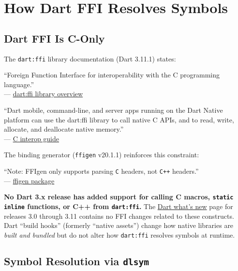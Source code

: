 \documentclass[11pt,a4paper]{article}
\newcommand{\code}[1]{\texttt{#1}}
\begin{document}
\section{How Dart FFI Resolves Symbols}
\label{sec:ffi-symbols}

\subsection{Dart FFI Is C-Only}

The \code{dart:ffi} library documentation (Dart 3.11.1) states:

\begin{quotebox}
``Foreign Function Interface for interoperability with the C programming
language.''\\
--- \href{https://api.dart.dev/stable/latest/dart-ffi/dart-ffi-library.html}{dart:ffi library overview}
\end{quotebox}

\begin{quotebox}
``Dart mobile, command-line, and server apps running on the Dart Native
platform can use the dart:ffi library to call native C APIs, and to read,
write, allocate, and deallocate native memory.''\\
--- \href{https://dart.dev/interop/c-interop}{C interop guide}
\end{quotebox}

The binding generator (\code{ffigen} v20.1.1) reinforces this constraint:

\begin{quotebox}
``Note: FFIgen only supports parsing \texttt{C} headers, not \texttt{C++} headers.''\\
--- \href{https://pub.dev/packages/ffigen}{ffigen package}
\end{quotebox}

\textbf{No Dart 3.x release has added support for calling C macros,
\code{static inline} functions, or C++ from \code{dart:ffi}.} The
\href{https://dart.dev/resources/whats-new}{Dart what's new} page for
releases 3.0 through 3.11 contains no FFI changes related to these
constructs. Dart ``build hooks'' (formerly ``native assets'') change how
native libraries are \emph{built and bundled} but do not alter how
\code{dart:ffi} resolves symbols at runtime.


\subsection{Symbol Resolution via \code{dlsym}}
\end{document}
